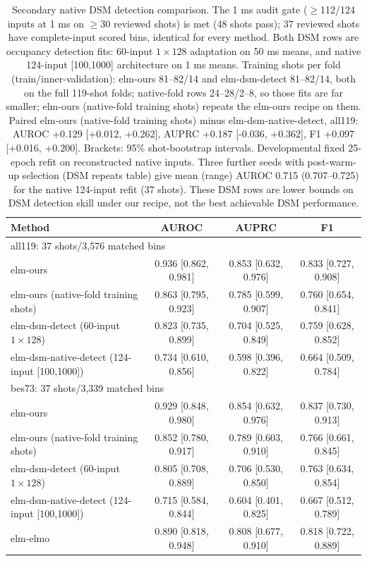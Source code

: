 \begin{table}[t]
\centering
\small
\begin{tabular}{lccc}
\toprule
Method & AUROC & AUPRC & F1 \\
\midrule
\multicolumn{4}{l}{all119: 37 shots/3,576 matched bins} \\
elm-ours & 0.936 {\scriptsize[0.862, 0.981]} & 0.853 {\scriptsize[0.632, 0.976]} & 0.833 {\scriptsize[0.727, 0.908]} \\
elm-ours (native-fold training shots) & 0.863 {\scriptsize[0.795, 0.923]} & 0.785 {\scriptsize[0.599, 0.907]} & 0.760 {\scriptsize[0.654, 0.841]} \\
elm-dsm-detect (60-input $1\times128$) & 0.823 {\scriptsize[0.735, 0.899]} & 0.704 {\scriptsize[0.525, 0.849]} & 0.759 {\scriptsize[0.628, 0.852]} \\
elm-dsm-native-detect (124-input [100,1000]) & 0.734 {\scriptsize[0.610, 0.856]} & 0.598 {\scriptsize[0.396, 0.822]} & 0.664 {\scriptsize[0.509, 0.784]} \\
\midrule
\multicolumn{4}{l}{bes73: 37 shots/3,339 matched bins} \\
elm-ours & 0.929 {\scriptsize[0.848, 0.980]} & 0.854 {\scriptsize[0.632, 0.976]} & 0.837 {\scriptsize[0.730, 0.913]} \\
elm-ours (native-fold training shots) & 0.852 {\scriptsize[0.780, 0.917]} & 0.789 {\scriptsize[0.603, 0.910]} & 0.766 {\scriptsize[0.661, 0.845]} \\
elm-dsm-detect (60-input $1\times128$) & 0.805 {\scriptsize[0.708, 0.889]} & 0.706 {\scriptsize[0.530, 0.850]} & 0.763 {\scriptsize[0.634, 0.854]} \\
elm-dsm-native-detect (124-input [100,1000]) & 0.715 {\scriptsize[0.584, 0.844]} & 0.604 {\scriptsize[0.401, 0.825]} & 0.667 {\scriptsize[0.512, 0.789]} \\
elm-elmo & 0.890 {\scriptsize[0.818, 0.948]} & 0.808 {\scriptsize[0.677, 0.910]} & 0.818 {\scriptsize[0.722, 0.889]} \\
\bottomrule
\end{tabular}\caption{Secondary native DSM detection comparison. The 1 ms audit gate ($\geq$112/124 inputs at 1 ms on $\geq$30 reviewed shots) is met (48 shots pass); 37 reviewed shots have complete-input scored bins, identical for every method. Both DSM rows are occupancy detection fits: 60-input $1\times128$ adaptation on 50 ms means, and native 124-input [100,1000] architecture on 1 ms means. Training shots per fold (train/inner-validation): elm-ours 81--82/14 and elm-dsm-detect 81--82/14, both on the full 119-shot folds; native-fold rows 24--28/2--8, so those fits are far smaller; elm-ours (native-fold training shots) repeats the elm-ours recipe on them. Paired elm-ours (native-fold training shots) minus elm-dsm-native-detect, all119: AUROC +0.129 [+0.012, +0.262], AUPRC +0.187 [-0.036, +0.362], F1 +0.097 [+0.016, +0.200]. Brackets: 95\% shot-bootstrap intervals. Developmental fixed 25-epoch refit on reconstructed native inputs. Three further seeds with post-warm-up selection (DSM repeats table) give mean (range) AUROC 0.715 (0.707--0.725) for the native 124-input refit (37 shots). These DSM rows are lower bounds on DSM detection skill under our recipe, not the best achievable DSM performance.}
\label{tab:elm-native-detection}
\end{table}
